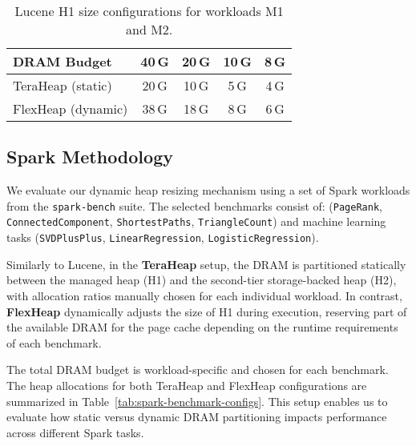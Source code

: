 \begin{table}[H]
\centering
\renewcommand{\arraystretch}{1.1}
\caption{Lucene H1 size configurations for workloads M1 and M2.}
\label{tab:lucene-configs}
\begin{tabular}{|l|c|c|c|c|}

\hline
  \textbf{DRAM Budget} & 40\,G & 20\,G & 10\,G & 8\,G \\
\hline
  TeraHeap (static)& 20\,G & 10\,G & 5\,G & 4\,G \\
\hline
  FlexHeap (dynamic)& 38\,G & 18\,G  & 8\,G & 6\,G \\
\hline
 
\end{tabular}
\end{table}

\subsection{Spark Methodology}
\label{sec:spark-methodology}

We evaluate our dynamic heap resizing mechanism using a set of Spark workloads 
from the \texttt{spark-bench} suite. The selected benchmarks consist of:
(\texttt{PageRank}, \texttt{ConnectedComponent}, \texttt{ShortestPaths}, \texttt{TriangleCount}) 
and machine learning tasks (\texttt{SVDPlusPlus}, \texttt{LinearRegression}, \texttt{LogisticRegression}).

Similarly to Lucene, in the \textbf{TeraHeap} setup, the DRAM is partitioned statically between the managed heap (H1) and the second-tier 
storage-backed heap (H2), with allocation ratios manually chosen for each individual workload. In contrast, \textbf{FlexHeap} 
dynamically adjusts the size of H1 during execution, reserving part of the available DRAM for the page cache depending on
the runtime requirements of each benchmark. 

The total DRAM budget is workload-specific and chosen for each benchmark.
The heap allocations for both TeraHeap and FlexHeap configurations are summarized in Table~\ref{tab:spark-benchmark-configs}.
This setup enables us to evaluate how static versus dynamic DRAM partitioning impacts performance across different Spark tasks.

